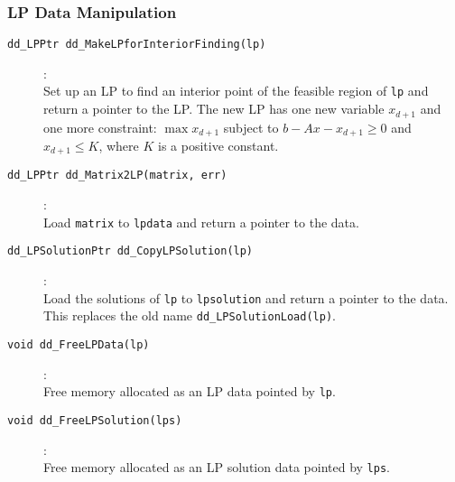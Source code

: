 \documentclass[11pt]{article}
\newcommand {\0} {{\bf 0}}
\begin{document}
\subsubsection{LP Data Manipulation}
\begin{description}

\item[{\tt dd\_LPPtr dd\_MakeLPforInteriorFinding(lp)}]:\\
Set up an LP to find an interior point of the feasible region of {\tt lp}
and return a pointer to the LP.  The new LP has one new variable
$x_{d+1}$ and one more constraint:
$\max x_{d+1}$ subject to $b - A x - x_{d+1} \ge 0$ and $x_{d+1} \le K$,
where $K$ is a positive constant.

\item[{\tt dd\_LPPtr dd\_Matrix2LP(matrix, err)}]:\\
Load {\tt matrix} to {\tt lpdata} and return a pointer to the data.

\item[{\tt dd\_LPSolutionPtr dd\_CopyLPSolution(lp)}]:\\
Load the solutions of {\tt lp} to {\tt lpsolution} and
return a pointer to the data.  This replaces the old name
{\tt dd\_LPSolutionLoad(lp)}.

\item[{\tt void dd\_FreeLPData(lp)}]:\\
Free memory allocated as an LP data pointed by {\tt lp}.

\item[{\tt void dd\_FreeLPSolution(lps)}]:\\
Free memory allocated as an LP solution data pointed by {\tt lps}.

\end{description}
\end{document}
